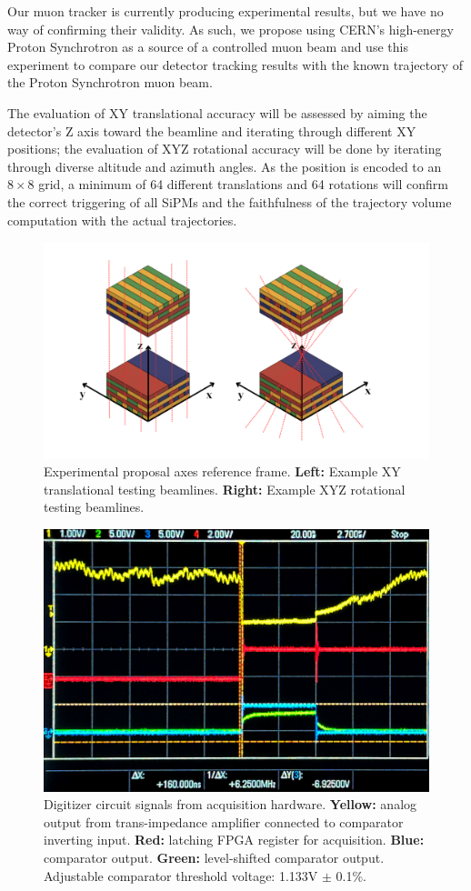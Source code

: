 Our muon tracker is currently producing experimental results, but we have no way of confirming their validity. As such, we propose using CERN’s high-energy Proton Synchrotron as a source of a controlled muon beam and use this experiment to compare our detector tracking results with the known trajectory of the Proton Synchrotron muon beam.

The evaluation of XY translational accuracy will be assessed by aiming the detector’s Z axis toward the beamline and iterating through different XY positions; the evaluation of XYZ rotational accuracy will be done by iterating through diverse altitude and azimuth angles. As the position is encoded to an $8 \times 8$ grid, a minimum of 64 different translations and 64 rotations will confirm the correct triggering of all SiPMs and the faithfulness of the trajectory volume computation with the actual trajectories.
\begin{figure} [h]
    \centering
    \includegraphics[scale=0.2]{figures/proposed test.png}
    \caption{Experimental proposal axes reference frame. \textbf{Left:} Example XY translational testing beamlines. \textbf{Right:} Example XYZ rotational testing beamlines.}
    \label{proposed tests}
\end{figure}

\begin{figure} [h]
    \centering
    \includegraphics[width=0.58\linewidth]{figures/digitizer all.png}
    \caption{Digitizer circuit signals from acquisition hardware. \textbf{Yellow:} analog output from trans-impedance amplifier connected to comparator inverting input. \textbf{Red:} latching FPGA register for acquisition. \textbf{Blue:} comparator output. \textbf{Green:} level-shifted comparator output. Adjustable comparator threshold voltage: 1.133V $\pm$ 0.1\%.}
    \label{digitizer}
\end{figure}